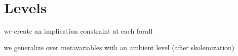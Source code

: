 \section{Levels}

we create an implication constraint at each forall

we generalize over metavariables with an ambient level (after skolemization)























